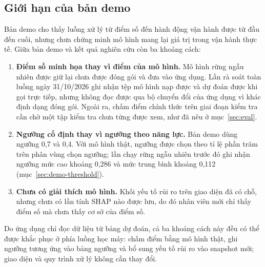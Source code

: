 \documentclass[12pt,a4paper]{report}
\begin{document}
\FloatBarrier
\subsection{Giới hạn của bản demo}\label{sec:demo-limits}

Bản demo cho thấy luồng xử lý từ điểm số đến hành động vận hành được từ đầu đến cuối, nhưng chưa chứng minh mô hình mang lại giá trị trong vận hành thực tế. Giữa bản demo và kết quả nghiên cứu còn ba khoảng cách:

\begin{enumerate}
  \item \textbf{Điểm số minh họa thay vì điểm của mô hình.} Mô hình rừng ngẫu nhiên được giữ lại chưa được đóng gói và đưa vào ứng dụng. Lần rà soát toàn luồng ngày 31/10/2026 ghi nhận tệp mô hình nạp được và dự đoán được khi gọi trực tiếp, nhưng không đọc được qua bộ chuyển đổi của ứng dụng vì khác định dạng đóng gói. Ngoài ra, chấm điểm chính thức trên giai đoạn kiểm tra cần chờ một tập kiểm tra chưa từng được xem, như đã nêu ở mục~\ref{sec:eval}.
  \item \textbf{Ngưỡng cố định thay vì ngưỡng theo năng lực.} Bản demo dùng ngưỡng 0,7 và 0,4. Với mô hình thật, ngưỡng được chọn theo tỉ lệ phần trăm trên phân vùng chọn ngưỡng; lần chạy rừng ngẫu nhiên trước đó ghi nhận ngưỡng mức cao khoảng 0,286 và mức trung bình khoảng 0,112 (mục~\ref{sec:demo-threshold}).
  \item \textbf{Chưa có giải thích mô hình.} Khối yếu tố rủi ro trên giao diện đã có chỗ, nhưng chưa có lần tính SHAP nào được lưu, do đó nhân viên mới chỉ thấy điểm số mà chưa thấy cơ sở của điểm số.
\end{enumerate}

Do ứng dụng chỉ đọc dữ liệu từ bảng dự đoán, cả ba khoảng cách này đều có thể được khắc phục ở phía luồng học máy: chấm điểm bằng mô hình thật, ghi ngưỡng tương ứng vào bảng ngưỡng và bổ sung yếu tố rủi ro vào snapshot mới; giao diện và quy trình xử lý không cần thay đổi.
 
\end{document}
